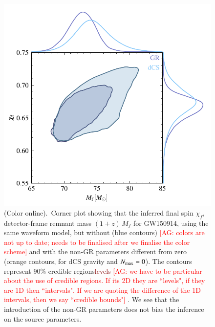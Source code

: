 \documentclass[twocolumn,
               prd,
               aps,
               superscriptaddress,
               tightenlines,
               nofootinbib,
               eqsecnum,
               amsfonts,
               amsmath,
               longbibliography]{revtex4-1}
\newcommand{\agcomm}[1]{{\textcolor{red}{{[AG: #1]}} }}
\newcommand{\ag}[1]{{\textcolor{Maroon}{{#1}} }}
\begin{document}
\begin{figure}[t]
\includegraphics[width=0.9\columnwidth]{figs/tmp_GW150914_intrinsic_params_remnant.pdf}
\caption{(Color online).~Corner plot showing that the inferred final spin $\chi_f$,
detector-frame remnant mass $(1 + z) \, M_f$ for GW150914, using the same waveform model,
but without (blue contours) \agcomm{colors are not up to date; needs to be
finalised after we finalise the color scheme} and with the non-GR parameters
different from zero (orange contours, for
dCS gravity and $N_{\rm max}=0$). The contours represent 90\% credible \sout{regions}\ag{levels}\agcomm{we have to be particular about the use of credible regions. If its 2D they are ``levels", if they are 1D then ``intervals". If we are quoting the difference of the 1D intervals, then we say ``credible bounds"}.
%
We see that the introduction of the non-GR parameters does not bias the
inference on the source parameters.
}
\label{fig:corner_plot}
\end{figure}
\end{document}
